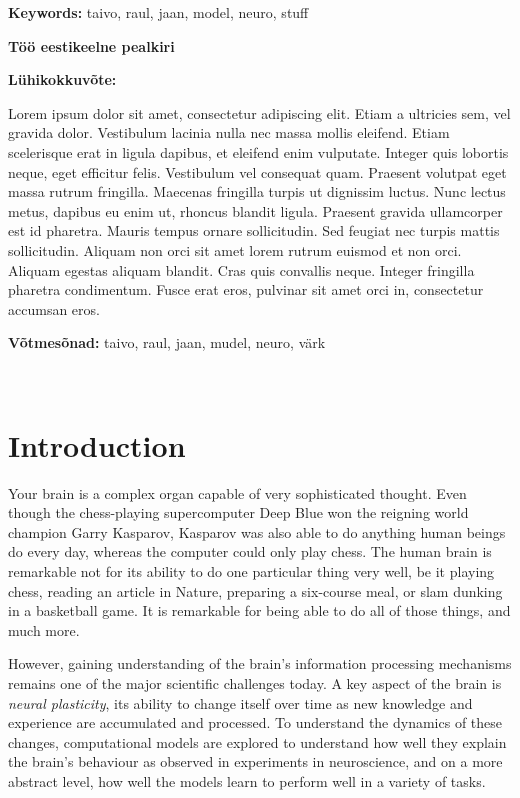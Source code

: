 \documentclass[a4paper,12pt]{report}
\theoremstyle{definition}
\begin{document}
\textbf{Keywords:} taivo, raul, jaan, model, neuro, stuff

\vspace{1.5cm}



{\textbf
{\Large Töö eestikeelne pealkiri}}

\textbf{Lühikokkuvõte:}

Lorem ipsum dolor sit amet, consectetur adipiscing elit. Etiam a ultricies sem, vel gravida dolor. Vestibulum lacinia nulla nec massa mollis eleifend. Etiam scelerisque erat in ligula dapibus, et eleifend enim vulputate. Integer quis lobortis neque, eget efficitur felis. Vestibulum vel consequat quam. Praesent volutpat eget massa rutrum fringilla. Maecenas fringilla turpis ut dignissim luctus. Nunc lectus metus, dapibus eu enim ut, rhoncus blandit ligula. Praesent gravida ullamcorper est id pharetra. Mauris tempus ornare sollicitudin. Sed feugiat nec turpis mattis sollicitudin. Aliquam non orci sit amet lorem rutrum euismod et non orci. Aliquam egestas aliquam blandit. Cras quis convallis neque. Integer fringilla pharetra condimentum. Fusce erat eros, pulvinar sit amet orci in, consectetur accumsan eros.

\textbf{Võtmesõnad:} taivo, raul, jaan, mudel, neuro, värk


\
\thispagestyle{empty}
\pagebreak

\tableofcontents
\newpage



\chapter*{Introduction}


Your brain is a complex organ capable of very sophisticated thought. Even though the chess-playing supercomputer Deep Blue won the reigning world champion Garry Kasparov, Kasparov was also able to do anything human beings do every day, whereas the computer could only play chess. The human brain is remarkable not for its ability to do one particular thing very well, be it playing chess, reading an article in Nature, preparing a six-course meal, or slam dunking in a basketball game. It is remarkable for being able to do all of those things, and much more.

However, gaining understanding of the brain's information processing mechanisms remains one of the major scientific challenges today. A key aspect of the brain is \emph{neural plasticity}, its ability to change itself over time as new knowledge and experience are accumulated and processed. To understand the dynamics of these changes, computational models are explored to understand how well they explain the brain's behaviour as observed in experiments in neuroscience, and on a more abstract level, how well the models learn to perform well in a variety of tasks.
\end{document}
